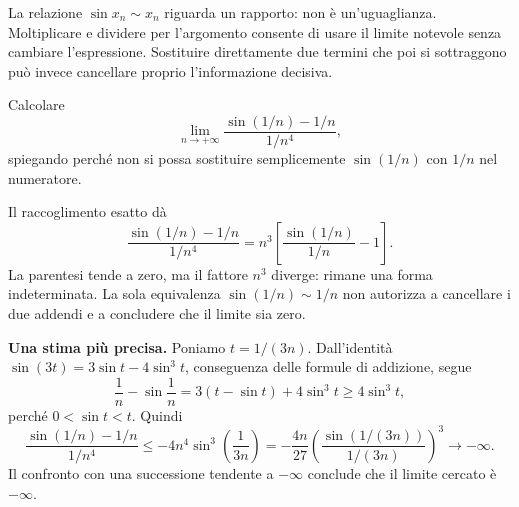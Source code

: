 La relazione $\sin x_n\sim x_n$ riguarda un rapporto: non è un'uguaglianza. Moltiplicare e dividere per l'argomento consente di usare il limite notevole senza cambiare l'espressione. Sostituire direttamente due termini che poi si sottraggono può invece cancellare proprio l'informazione decisiva.

\begin{esercizio}
Calcolare
\[
\lim_{n\to+\infty}\frac{\sin(1/n)-1/n}{1/n^4},
\]
spiegando perché non si possa sostituire semplicemente $\sin(1/n)$ con $1/n$ nel numeratore.
\end{esercizio}
\begin{svolgimento}
Il raccoglimento esatto dà
\[
\frac{\sin(1/n)-1/n}{1/n^4}
=n^3\left[\frac{\sin(1/n)}{1/n}-1\right].
\]
La parentesi tende a zero, ma il fattore $n^3$ diverge: rimane una forma indeterminata. La sola equivalenza $\sin(1/n)\sim1/n$ non autorizza a cancellare i due addendi e a concludere che il limite sia zero.

\textbf{Una stima più precisa.} Poniamo $t=1/(3n)$. Dall'identità $\sin(3t)=3\sin t-4\sin^3t$, conseguenza delle formule di addizione, segue
\[
\frac1n-\sin\frac1n
=3(t-\sin t)+4\sin^3t\ge4\sin^3t,
\]
perché $0<\sin t<t$. Quindi
\[
\frac{\sin(1/n)-1/n}{1/n^4}
\le-4n^4\sin^3\!\left(\frac1{3n}\right)
=-\frac{4n}{27}\left(\frac{\sin(1/(3n))}{1/(3n)}\right)^3
\longrightarrow-\infty.
\]
Il confronto con una successione tendente a $-\infty$ conclude che il limite cercato è $-\infty$.
\end{svolgimento}
